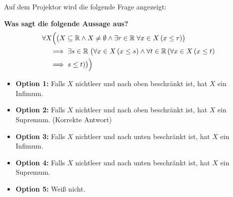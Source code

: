 \begin{meta-note}
Auf dem Projektor wird die folgende Frage angezeigt:
\begin{center}
\textbf{Was sagt die folgende Aussage aus?}
\begin{align}
&\forall X \Bigl( \bigl( X \subseteq \mathbb{R} \wedge X \neq \emptyset \wedge \exists r \in \mathbb{R} \; \forall x \in X \, (x \le r) \bigr) \\
&\quad \implies \exists s \in \mathbb{R} \; \bigl( \forall x \in X \, (x \le s) \wedge \forall t \in \mathbb{R} \, ( \forall x \in X \, (x \le t) \\
&\quad \implies s \le t ) \bigr) \Bigr)
\end{align}
\end{center}
\begin{itemize}
    \item \textbf{Option 1:} Falls $X$ nichtleer und nach oben beschränkt ist, hat $X$ ein Infimum.
    \item \textbf{Option 2:} Falls $X$ nichtleer und nach oben beschränkt ist, hat $X$ ein Supremum. (Korrekte Antwort)
    \item \textbf{Option 3:} Falls $X$ nichtleer und nach unten beschränkt ist, hat $X$ ein Infimum.
    \item \textbf{Option 4:} Falls $X$ nichtleer und nach unten beschränkt ist, hat $X$ ein Supremum.
    \item \textbf{Option 5:} Weiß nicht.
\end{itemize}
\end{meta-note}

